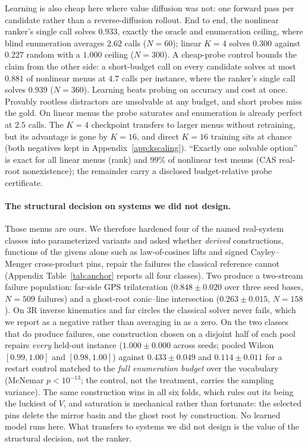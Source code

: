 \documentclass[letterpaper]{article} %
\begin{document}
Learning is also cheap here where value diffusion was not: one forward pass per
candidate rather than a reverse-diffusion rollout. End to end, the nonlinear ranker's single
call solves $0.933$,
exactly the oracle and enumeration ceiling, where blind enumeration averages $2.62$ calls
($N{=}60$); linear $K{=}4$ solves $0.300$ against $0.227$ random with a $1.000$ ceiling
($N{=}300$). A cheap-probe control bounds the claim from the other side: a short-budget call on
every candidate solves at most $0.881$ of nonlinear menus at $4.7$ calls per instance, where
the ranker's single call solves $0.939$ ($N{=}360$). Learning beats probing on accuracy
and cost at once. Provably rootless distractors are unsolvable at any budget, and short
probes miss the gold. On linear menus the probe saturates and enumeration is
already perfect at $2.5$ calls. The $K = 4$ checkpoint transfers to larger menus without
retraining, but its advantage is gone by $K = 16$, and direct $K = 16$ training sits at chance (both negatives kept in
Appendix~\ref{app:kscaling}). ``Exactly one solvable option'' is exact for all linear menus (rank) and $99\%$ of nonlinear
test menus (CAS real-root nonexistence); the remainder carry a disclosed budget-relative
probe certificate.

\paragraph{The structural decision on systems we did not design.}
Those menus are ours. We therefore hardened four of the named real-system classes into
parameterized variants and asked whether \emph{derived} constructions, functions of the
givens alone such as law-of-cosines lifts and signed Cayley--Menger cross-product pins,
repair the failures the classical reference cannot (Appendix Table~\ref{tab:anchor} reports
all four classes). Two produce a two-stream failure population: far-side GPS trilateration ($0.848 \pm 0.020$
over three seed bases, $N{=}509$ failures) and a ghost-root conic--line intersection
($0.263 \pm 0.015$, $N{=}158$). On 3R inverse kinematics and far circles the classical solver
never fails, which we report as a negative rather than averaging in as a zero. On the two classes that do produce failures, one construction chosen on a disjoint half of
each pool repairs
\emph{every} held-out instance ($1.000 \pm 0.000$ across seeds; pooled Wilson $[0.99, 1.00]$
and $[0.98, 1.00]$) against $0.433 \pm 0.049$ and $0.114 \pm 0.011$ for a restart control
matched to the \emph{full enumeration budget} over the vocabulary (McNemar
$p < 10^{-13}$; the control, not the treatment, carries the sampling variance). The same
construction wins in all six folds, which rules out its being the luckiest of $V$, and
saturation is
mechanical rather than fortunate: the selected pins delete the mirror basin and the ghost
root by construction. No learned model runs here. What transfers to systems we did not
design is the value of the structural decision, not the ranker.
\end{document}
